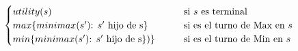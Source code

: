 \documentclass[preview]{standalone}
\begin{document}
\begin{align*}
\begin{cases}
                                 utility(s) \qquad &\text{si $s$ es terminal} \cr
                                 max\{minimax(\text{$s'$): $s'$ hijo de }$s$\}\qquad &\text{si es el turno de Max en $s$} \cr
                                 min\{minimax(\text{$s'$): $s'$ hijo de }$s$\})\}\qquad &\text{si es el turno de Min en $s$} \cr
                                 \end{cases}
\end{align*}
\end{document}
